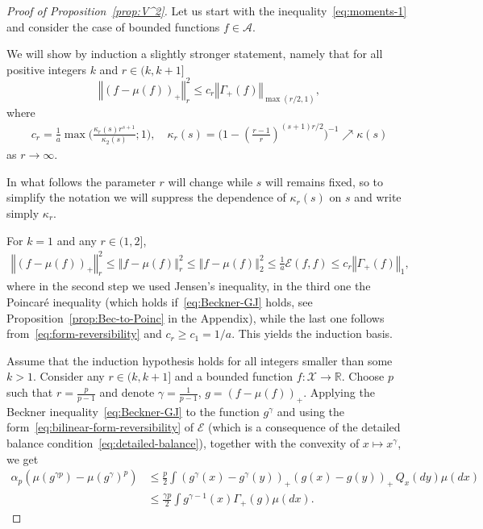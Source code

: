 \documentclass[a4paper]{amsart}
\theoremstyle{definition}
\theoremstyle{remark}
\numberwithin{equation}{section}
\newcommand*{\RR}{\mathbb{R}}
\newcommand*{\calE}{\mathcal{E}}
\newcommand*{\norm}[1]{\left\Vert #1 \right\Vert}
\begin{document}
\begin{proof}[Proof of Proposition~\ref{prop:V^2}]


Let us start with the inequality~\eqref{eq:moments-1} and consider the case of bounded functions $f \in \mathcal{A}$.

We will show by induction a slightly stronger statement, namely that for all positive integers $k$ and $r\in (k,k+1]$
\begin{equation*}\label{eq:AS_pf_induction}
	\norm{(f-\mu (f))_+}_{r}^2 \le c_r \norm{\Gamma_+(f)}_{\max(r/2,1)},
\end{equation*}
where
\begin{align}\label{eq:kappa-and-c}
	c_r = \frac{1}{a}\max\big(\frac{\kappa_r(s)r^{s+1}}{\kappa_2(s)};1\big),
	\quad
	\kappa_r(s) = \Big( 1 - \left( \frac{r-1}{r} \right)^{(s+1)r/2}\Big)^{-1} \nearrow \kappa(s)
\end{align}
as $r\to\infty$.

In what follows the parameter $r$ will change while $s$ will remains fixed, so to simplify the notation we will suppress the dependence of $\kappa_r(s)$ on $s$ and write simply $\kappa_r$.

For $k=1$ and any $r\in (1,2]$,
\begin{align}\label{eq:application-of-Poincare}
	\norm{(f-\mu (f))_+}_r^2
	\le
	\norm{f-\mu (f)}_{r}^2
	\le
	\norm{f-\mu (f)}_{2}^2
	\le
	\frac{1}{a}\calE(f,f)
	\le
	c_r\norm{\Gamma_+(f)}_{1},
\end{align}
where in the second step we used Jensen's inequality, in the third one the Poincar\'{e} inequality (which holds if~\eqref{eq:Beckner-GJ} holds, see Proposition~\ref{prop:Bec-to-Poinc} in the Appendix), while the last one follows from~\eqref{eq:form-reversibility} and $c_r \ge c_1 = 1/a$. This yields the induction basis.

Assume that the induction hypothesis holds for all integers smaller than some $k>1$. Consider any $r\in(k,k+1]$ and a bounded function $f\colon \mathcal{X} \to \RR$.
Choose $p$ such that $r=\frac{p}{p-1}$ and denote $\gamma=\frac{1}{p-1}$, $g=(f-\mu(f))_+$.
Applying the Beckner inequality~\eqref{eq:Beckner-GJ} to the function $g^{\gamma}$ and using the form~\eqref{eq:bilinear-form-reversibility} of $\calE$ (which is a consequence of the detailed balance condition~\eqref{eq:detailed-balance}), together with the convexity of $x\mapsto x^\gamma$, we get
\begin{align}\label{eq:convexity}
	\alpha_p(\mu(g^{\gamma p})	 - \mu(g^\gamma)^p) &\le
	\frac{p}{2}\int (g^\gamma(x)-g^\gamma(y))_+(g(x)-g(y))_+\,Q_x(dy)\mu(dx) \nonumber \\
	&\le \frac{\gamma p}{2}\int g^{\gamma - 1}(x)\Gamma_+(g)\mu(dx).
\end{align}


\end{proof}
\end{document}
